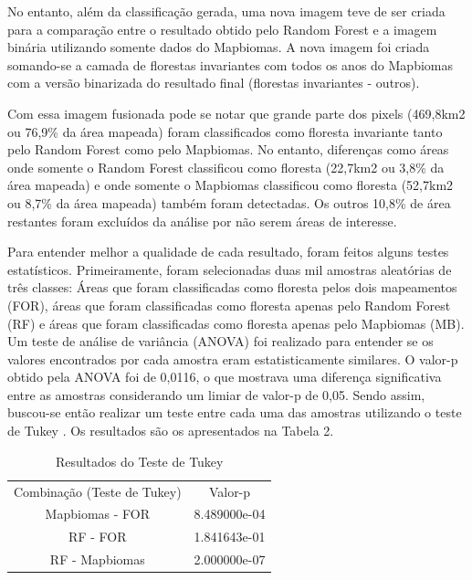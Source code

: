 \documentclass[12pt,a4paper]{article}
\begin{document}
No entanto, além da classificação gerada, uma nova imagem teve de ser criada para a comparação entre o resultado obtido pelo Random Forest e a imagem binária utilizando somente dados do Mapbiomas. A nova imagem foi criada somando-se a camada de florestas invariantes com todos os anos do Mapbiomas com a versão binarizada do resultado final (florestas invariantes - outros).

Com essa imagem fusionada pode se notar que grande parte dos pixels (469,8km2 ou 76,9\% da área mapeada) foram classificados como floresta invariante tanto pelo Random Forest como pelo Mapbiomas. No entanto, diferenças como áreas onde somente o Random Forest classificou como floresta (22,7km2 ou 3,8\% da área mapeada) e onde somente o Mapbiomas classificou como floresta (52,7km2 ou 8,7\% da área mapeada) também foram detectadas. Os outros 10,8\% de área restantes foram excluídos da análise por não serem áreas de interesse.

Para entender melhor a qualidade de cada resultado, foram feitos alguns testes estatísticos. Primeiramente, foram selecionadas duas mil amostras aleatórias de três classes: Áreas que foram classificadas como floresta pelos dois mapeamentos (FOR), áreas que foram classificadas como floresta apenas pelo Random Forest (RF) e áreas que foram classificadas como floresta apenas pelo Mapbiomas (MB). Um teste de análise de variância (ANOVA) foi realizado para entender se os valores encontrados por cada amostra eram estatisticamente similares. O valor-p obtido pela ANOVA foi de 0,0116, o que mostrava uma diferença significativa entre as amostras considerando um limiar de valor-p de 0,05. Sendo assim, buscou-se então realizar um teste entre cada uma das amostras utilizando o teste de Tukey \citep{Tukey1949}. Os resultados são os apresentados na Tabela 2.

\begin{table}[h!]
    \centering
    \begin{tabular}{|c | c|}
    Combinação (Teste de Tukey) &  Valor-p      \\
                Mapbiomas - FOR &  8.489000e-04 \\
                       RF - FOR &  1.841643e-01 \\
                 RF - Mapbiomas &  2.000000e-07 \\
    \end{tabular}
    \caption{Resultados do Teste de Tukey}
    \label{tab:2}
\end{table}
\end{document}
